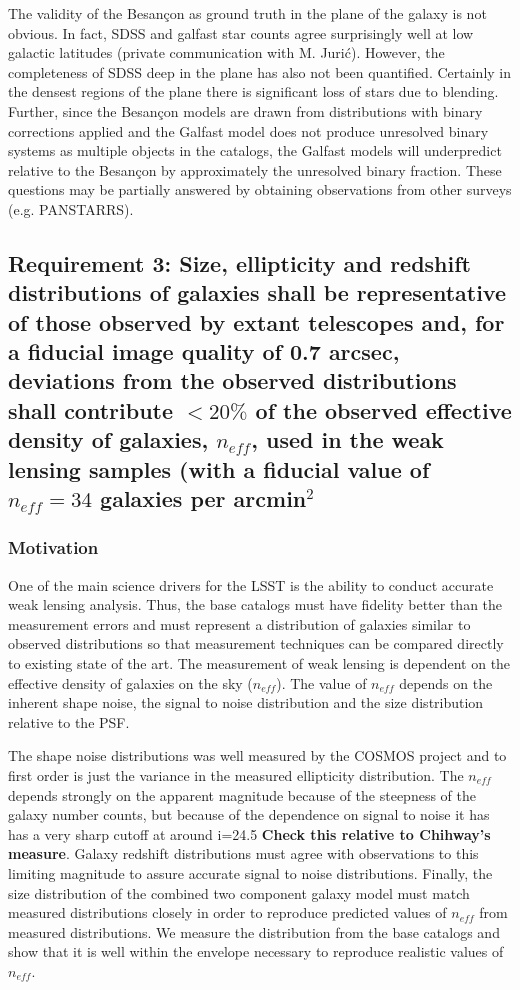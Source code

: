 \documentclass[]{article}
\begin{document}
The validity of the Besan\c{c}on as ground truth in the plane of the galaxy is not obvious.  In fact, SDSS and galfast star counts agree surprisingly well at low galactic latitudes (private communication with M. Juri\'{c}). 
However, the completeness of SDSS deep in the plane has also not been quantified.  Certainly in the densest regions
of the plane there is significant loss of stars due to blending.  Further, since the Besan\c{c}on models are drawn
from distributions with binary corrections applied and the Galfast model does not produce unresolved binary systems
as multiple objects in the catalogs, the Galfast models will underpredict relative to the Besan\c{c}on by 
approximately the unresolved binary fraction.  These questions may be partially answered by obtaining observations
from other surveys (e.g. PANSTARRS).
\clearpage

\subsection{Requirement 3: Size, ellipticity and redshift distributions of galaxies shall be representative of those observed by extant
telescopes and, for a fiducial image quality of 0.7 arcsec, deviations from the observed distributions shall
contribute $< 20\%$ of the observed effective density of galaxies, $n_{eff}$, used in the weak lensing samples (with a fiducial value of
$n_{eff} = 34$ galaxies per arcmin$^2$}
\subsubsection{Motivation}
One of the main science drivers for the LSST is the ability to conduct accurate weak lensing analysis.  Thus, the base catalogs must 
have fidelity better than the measurement errors and must represent a distribution of galaxies similar to observed distributions
so that measurement techniques can be compared directly to existing state of the art.  The measurement of weak lensing is dependent 
on the effective density of galaxies on the sky ($n_{eff}$).  The value of $n_{eff}$ depends on the inherent shape noise, the signal to noise distribution and the size distribution relative to the PSF.

The shape noise distributions was well measured by the COSMOS project and to first order is just the variance in the measured 
ellipticity distribution.  The $n_{eff}$ depends strongly on the apparent magnitude because of the steepness of the galaxy number
counts, but because of the dependence on signal to noise it has
has a very sharp cutoff at around i=24.5 {\bf Check this relative to Chihway's measure}.  Galaxy redshift distributions must
agree with observations to this limiting magnitude to assure accurate signal to noise distributions.  Finally, the size distribution
of the combined two component galaxy model must match measured distributions closely in order to reproduce predicted
values of $n_{eff}$ from measured distributions.  We measure the distribution from the base catalogs and show that it is well
within the envelope necessary to reproduce realistic values of $n_{eff}$.
\end{document}

